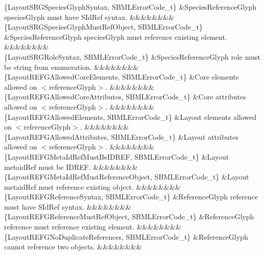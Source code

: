 \begin{DoxyParagraph}{}
\begin{longtabu}
\{Layout\+S\+R\+G\+Species\+Glyph\+Syntax, S\+B\+M\+L\+Error\+Code\+\_\+t\} &Species\+Reference\+Glyph \textquotesingle{}species\+Glyph\textquotesingle{} must have S\+Id\+Ref syntax. &&&&&&&&\\
\{Layout\+S\+R\+G\+Species\+Glyph\+Must\+Ref\+Object, S\+B\+M\+L\+Error\+Code\+\_\+t\} &Species\+Reference\+Glyph \textquotesingle{}species\+Glyph\textquotesingle{} must reference existing element. &&&&&&&&\\
\{Layout\+S\+R\+G\+Role\+Syntax, S\+B\+M\+L\+Error\+Code\+\_\+t\} &Species\+Reference\+Glyph \textquotesingle{}role\textquotesingle{} must be string from enumeration. &&&&&&&&\\
\{Layout\+R\+E\+F\+G\+Allowed\+Core\+Elements, S\+B\+M\+L\+Error\+Code\+\_\+t\} &Core elements allowed on {\ttfamily $<$reference\+Glyph$>$}. &&&&&&&&\\
\{Layout\+R\+E\+F\+G\+Allowed\+Core\+Attributes, S\+B\+M\+L\+Error\+Code\+\_\+t\} &Core attributes allowed on {\ttfamily $<$reference\+Glyph$>$}. &&&&&&&&\\
\{Layout\+R\+E\+F\+G\+Allowed\+Elements, S\+B\+M\+L\+Error\+Code\+\_\+t\} &Layout elements allowed on {\ttfamily $<$reference\+Glyph$>$}. &&&&&&&&\\
\{Layout\+R\+E\+F\+G\+Allowed\+Attributes, S\+B\+M\+L\+Error\+Code\+\_\+t\} &Layout attributes allowed on {\ttfamily $<$reference\+Glyph$>$}. &&&&&&&&\\
\{Layout\+R\+E\+F\+G\+Meta\+Id\+Ref\+Must\+Be\+I\+D\+R\+EF, S\+B\+M\+L\+Error\+Code\+\_\+t\} &Layout \textquotesingle{}metaid\+Ref\textquotesingle{} must be I\+D\+R\+EF. &&&&&&&&\\
\{Layout\+R\+E\+F\+G\+Meta\+Id\+Ref\+Must\+Reference\+Object, S\+B\+M\+L\+Error\+Code\+\_\+t\} &Layout \textquotesingle{}metaid\+Ref\textquotesingle{} must reference existing object. &&&&&&&&\\
\{Layout\+R\+E\+F\+G\+Reference\+Syntax, S\+B\+M\+L\+Error\+Code\+\_\+t\} &Reference\+Glyph \textquotesingle{}reference\textquotesingle{} must have S\+Id\+Ref syntax. &&&&&&&&\\
\{Layout\+R\+E\+F\+G\+Reference\+Must\+Ref\+Object, S\+B\+M\+L\+Error\+Code\+\_\+t\} &Reference\+Glyph \textquotesingle{}reference\textquotesingle{} must reference existing element. &&&&&&&&\\
\{Layout\+R\+E\+F\+G\+No\+Duplicate\+References, S\+B\+M\+L\+Error\+Code\+\_\+t\} &Reference\+Glyph cannot reference two objects. &&&&&&&&\\

\end{longtabu}
\end{DoxyParagraph}
